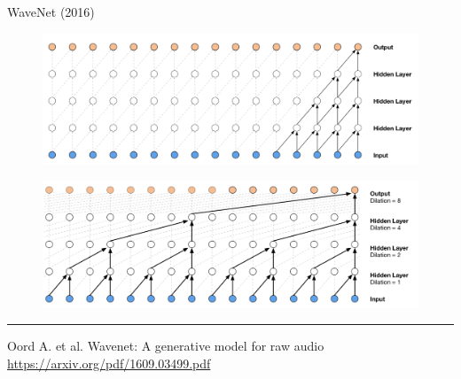 \begin{frame}{WaveNet (2016)}
\begin{figure}
    \centering
    \includegraphics[width=0.9\linewidth]{figs/wavenet1.png}
\end{figure}

\begin{figure}
    \centering
    \includegraphics[width=0.9\linewidth]{figs/wavenet2.png}
\end{figure}
\vfill
\hrule\medskip
{\scriptsize Oord A. et al. Wavenet: A generative model for raw audio \href{https://arxiv.org/pdf/1609.03499.pdf}{https://arxiv.org/pdf/1609.03499.pdf}}
\end{frame}

